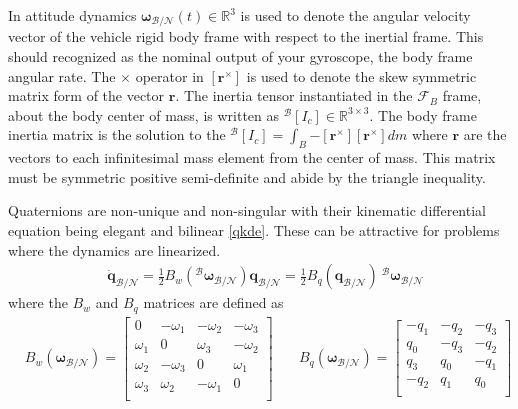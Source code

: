 \documentclass[conf]{new-aiaa}
\begin{document}
In attitude dynamics $\bm{\omega}_{\mathcal{B/N}}(t) \in \mathbb{R}^3$  is used to denote the angular velocity vector of the vehicle rigid body frame with respect to the inertial frame. This should recognized as the nominal output of your gyroscope, the body frame angular rate. The $\times$ operator in $\left[\mathbf{r}^\times \right]$ is used to denote the skew symmetric matrix form of the vector $\mathbf{r}$. The inertia tensor instantiated in the $\mathcal{F}_B$ frame, about the body center of mass, is written as $^\mathcal{B}[I_c] \in \mathbb{R}^{3\times 3}$. The body frame inertia matrix is the solution to the $^\mathcal{B}[I_c] = \int_B{-[\bm{r}^\times][\bm{r}^\times]dm} $ where $\bm{r}$ are the vectors to each infinitesimal mass element from the center of mass. This matrix must be symmetric positive semi-definite and abide by the triangle inequality.

Quaternions are non-unique and non-singular with their kinematic differential equation being elegant and bilinear \ref{qkde}. These can be attractive for problems where the dynamics are linearized.
% 
\begin{align}
\label{qkde}
 & \dot{\bm{q}}_{\mathcal{B/N}} = \frac{1}{2} B_w(^\mathcal{B}\bm{\omega}_{\mathcal{B/N}}) \bm{q}_{\mathcal{B/N}} = \frac{1}{2} B_q(\bm{q}_{\mathcal{B/N}}) \ ^\mathcal{B}\bm{\omega}_{\mathcal{B/N}}
\end{align}
% 
where the $B_w$ and $B_q$ matrices are defined as 
\begin{align}
& B_w(\bm{\omega}_{\mathcal{B/N}}) = 
	\begin{bmatrix}
	0 & -\omega_1 & -\omega_2 & -\omega_3\\ 
	\omega_1 & 0 & \omega_3 & -\omega_2 \\
	\omega_2 & -\omega_3 & 0 & \omega_1 \\
	\omega_3 & \omega_2 & -\omega_1  & 0  \\
	\end{bmatrix} \quad
& B_q(\bm{\omega}_{\mathcal{B/N}}) = 
	\begin{bmatrix}
	-q_1 & -q_2 & -q_3\\ 
	q_0 & -q_3 & -q_2 \\
	q_3 & q_0 & -q_1 \\
	-q_2 & q_1  & q_0  \\
	\end{bmatrix}
\end{align}
\end{document}
